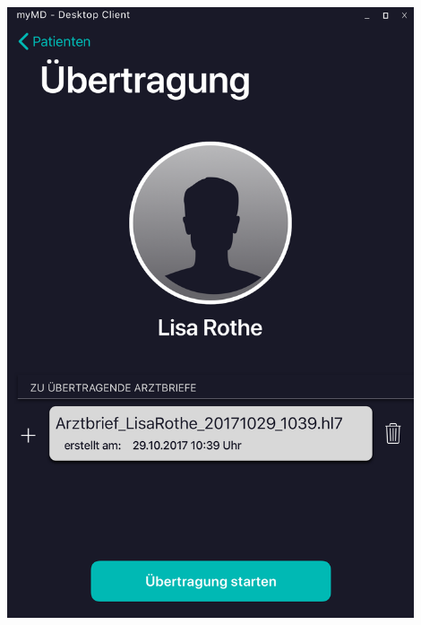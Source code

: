 \documentclass[a4paper]{scrreprt}
\begin{document}
\begin{minipage}[t][][b]{0.45\textwidth}
\includegraphics[width=0.9\textwidth]{mockups/SelectFiles}
\end{minipage}%
\hfill
\end{document}
